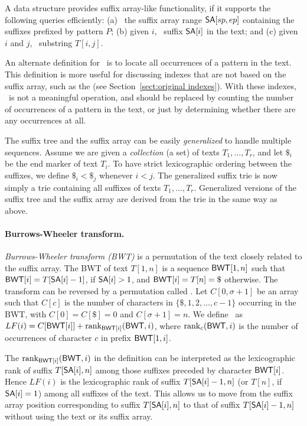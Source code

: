 \begin{definition}\label{def:suffix array}
A data structure provides suffix array-like functionality, if it supports the following queries efficiently: (a) \find\ the suffix array range $\mathsf{SA}[sp,ep]$ containing the suffixes prefixed by pattern $P$; (b) given $i$, \locate\ suffix $\mathsf{SA}[i]$ in the text; and (c) given $i$ and $j$, \extract\ substring $T[i,j]$.
\end{definition}

An alternate definition for \locate\ is to locate all occurrences of a pattern in the text. This definition is more useful for discussing indexes that are not based on the suffix array, such as the \lzindex{} (see Section~\ref{sect:original indexes}). With these indexes, \find\ is not a meaningful operation, and should be replaced by counting the number of occurrences of a pattern in the text, or just by determining whether there are any occurrences at all.

The suffix tree and the suffix array can be easily \emph{generalized} to handle multiple sequences. Assume we are given a \emph{collection} (a set) of texts $T_{1}, \dotsc, T_{r}$, and let $\$_{i}$ be the end marker of text $T_{i}$. To have strict lexicographic ordering between the suffixes, we define $\$_{i} < \$_{j}$ whenever $i < j$. The generalized suffix trie is now simply a trie containing all suffixes of texts $T_{1}, \dotsc, T_{r}$. Generalized versions of the suffix tree and the suffix array are derived from the trie in the same way as above.

\paragraph{Burrows-Wheeler transform.}

\emph{Burrows-Wheeler transform (BWT)} \cite{Burrows1994} is a permutation of the text closely related to the suffix array. The BWT of text $T[1,n]$ is a sequence $\mathsf{BWT}[1,n]$ such that $\mathsf{BWT}[i] = T[\mathsf{SA}[i] - 1]$, if $\mathsf{SA}[i] > 1$, and $\BWT[i] = T[n] = \$$ otherwise. The transform can be reversed by a permutation called \emph{\LF} \cite{Burrows1994,Ferragina2005a}. Let $C[0,\sigma+1]$ be an array such that $C[c]$ is the number of characters in $\{ \$, 1, 2, \dotsc, c-1 \}$ occurring in the BWT, with $C[0] = C[\$] = 0$ and $C[\sigma + 1] = n$. We define \LF\ as $LF(i) = C[\mathsf{BWT}[i]] + \operatorname{rank}_{\mathsf{BWT}[i]}(\mathsf{BWT},i)$, where $\operatorname{rank}_{c}(\mathsf{BWT},i)$ is the number of occurrences of character $c$ in prefix $\mathsf{BWT}[1,i]$.

The $\operatorname{rank}_{\mathsf{BWT}[i]}(\mathsf{BWT},i)$ in the definition can be interpreted as the lexicographic rank of suffix $T[\mathsf{SA}[i], n]$ among those suffixes preceded by character $\mathsf{BWT}[i]$. Hence $LF(i)$ is the lexicographic rank of suffix $T[\mathsf{SA}[i]-1, n]$ (or $T[n]$, if $\mathsf{SA}[i] = 1$) among all suffixes of the text. This allows us to move from the suffix array position corresponding to suffix $T[\mathsf{SA}[i], n]$ to that of suffix $T[\mathsf{SA}[i]-1, n]$ without using the text or its suffix array.

